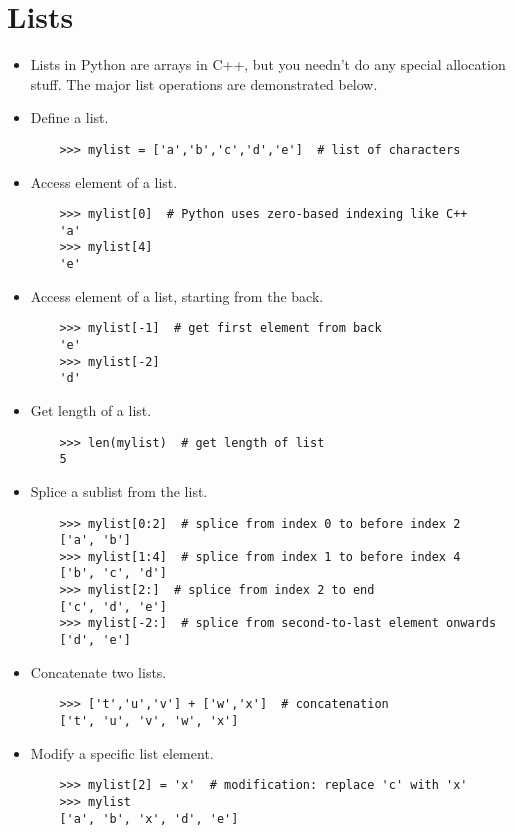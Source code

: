 \documentclass{article}
\begin{document}
\section{Lists}
\begin{itemize}
    \item Lists in Python are arrays in C++, but you needn't do any special allocation stuff. The major list operations are demonstrated below.
    \item Define a list.
    \begin{lstlisting}
    >>> mylist = ['a','b','c','d','e']  # list of characters
    \end{lstlisting}
    \item Access element of a list.
    \begin{lstlisting}
    >>> mylist[0]  # Python uses zero-based indexing like C++
    'a'
    >>> mylist[4]
    'e'
    \end{lstlisting}
    \item Access element of a list, starting from the back.
    \begin{lstlisting}
    >>> mylist[-1]  # get first element from back
    'e'
    >>> mylist[-2]
    'd'
    \end{lstlisting}
    \item Get length of a list.
    \begin{lstlisting}
    >>> len(mylist)  # get length of list
    5
    \end{lstlisting}
    \item Splice a sublist from the list.
    \begin{lstlisting}
    >>> mylist[0:2]  # splice from index 0 to before index 2
    ['a', 'b']
    >>> mylist[1:4]  # splice from index 1 to before index 4
    ['b', 'c', 'd']
    >>> mylist[2:]  # splice from index 2 to end
    ['c', 'd', 'e']
    >>> mylist[-2:]  # splice from second-to-last element onwards
    ['d', 'e']
    \end{lstlisting}
    \item Concatenate two lists.
    \begin{lstlisting}
    >>> ['t','u','v'] + ['w','x']  # concatenation
    ['t', 'u', 'v', 'w', 'x']
    \end{lstlisting}
    \item Modify a specific list element.
    \begin{lstlisting}
    >>> mylist[2] = 'x'  # modification: replace 'c' with 'x'
    >>> mylist
    ['a', 'b', 'x', 'd', 'e']
    \end{lstlisting}

\end{itemize}
\end{document}
